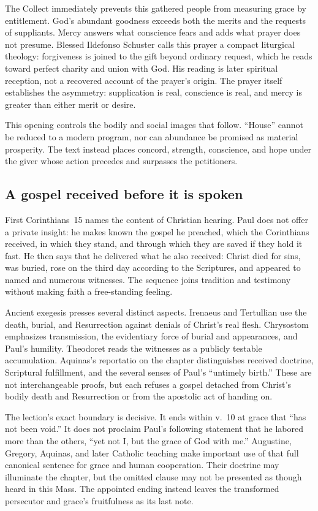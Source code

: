 The Collect immediately prevents this gathered people from measuring grace
by entitlement. God's abundant goodness exceeds both the merits and the
requests of suppliants. Mercy answers what conscience fears and adds what
prayer does not presume. Blessed Ildefonso Schuster calls this prayer a
compact liturgical theology: forgiveness is joined to the gift beyond
ordinary request, which he reads toward perfect charity and union with God.
His reading is later spiritual reception, not a recovered account of the
prayer's origin. The prayer itself establishes the asymmetry: supplication is
real, conscience is real, and mercy is greater than either merit or desire.

This opening controls the bodily and social images that follow. ``House''
cannot be reduced to a modern program, nor can abundance be promised as
material prosperity. The text instead places concord, strength, conscience,
and hope under the giver whose action precedes and surpasses the petitioners.

\subsection*{A gospel received before it is spoken}

First Corinthians~15 names the content of Christian hearing. Paul does not
offer a private insight: he makes known the gospel he preached, which the
Corinthians received, in which they stand, and through which they are saved if
they hold it fast. He then says that he delivered what he also received:
Christ died for sins, was buried, rose on the third day according to the
Scriptures, and appeared to named and numerous witnesses. The sequence joins
tradition and testimony without making faith a free-standing feeling.

Ancient exegesis presses several distinct aspects. Irenaeus and Tertullian use
the death, burial, and Resurrection against denials of Christ's real flesh.
Chrysostom emphasizes transmission, the evidentiary force of burial and
appearances, and Paul's humility. Theodoret reads the witnesses as a publicly
testable accumulation. Aquinas's reportatio on the chapter distinguishes
received doctrine, Scriptural fulfillment, and the several senses of Paul's
``untimely birth.'' These are not interchangeable proofs, but each refuses a
gospel detached from Christ's bodily death and Resurrection or from the
apostolic act of handing on.

The lection's exact boundary is decisive. It ends within v.~10 at grace that
``has not been void.'' It does not proclaim Paul's following statement that he
labored more than the others, ``yet not I, but the grace of God with me.''
Augustine, Gregory, Aquinas, and later Catholic teaching make important use of
that full canonical sentence for grace and human cooperation. Their doctrine
may illuminate the chapter, but the omitted clause may not be presented as
though heard in this Mass. The appointed ending instead leaves the transformed
persecutor and grace's fruitfulness as its last note.

